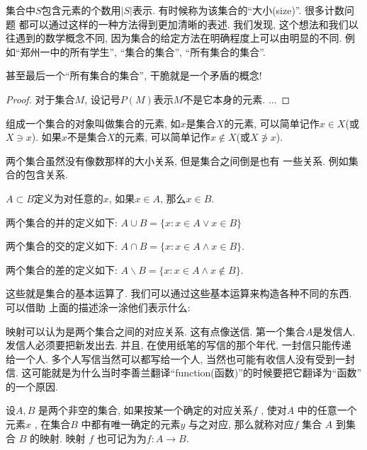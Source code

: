 集合中$S$包含元素的个数用$|S|$表示. 有时候称为该集合的``大小(size)''. 很多计数问题
都可以通过这样的一种方法得到更加清晰的表述. 
我们发现, 这个想法和我们以往遇到的数学概念不同, 因为集合的给定方法在明确程度上可以由明显的不同. 
例如``郑州一中的所有学生'', ``集合的集合'', ``所有集合的集合''.

甚至最后一个``所有集合的集合'', 干脆就是一个矛盾的概念! 

\begin{proof}
    对于集合$M$, 设记号$P(M)$表示$M$不是它本身的元素. ...
\end{proof}

组成一个集合的对象叫做集合的元素, 如$x$是集合$X$的元素, 可以简单记作$x\in X$(或$X\ni x$). 
如果$x$不是集合$X$的元素, 可以简单记作$x\not \in X$(或$X\not\ni x$). 

 两个集合虽然没有像数那样的大小关系, 但是集合之间倒是也有
一些关系. 例如集合的包含关系. 

\begin{definition}[集合的包含关系]
  $A\subset B$定义为对任意的$x$, 如果$x\in A$, 那么$x\in B$.  
\end{definition}

\begin{definition}
  两个集合的并的定义如下: $A\cup B=\{x:x\in A \lor x\in B\}$
\end{definition}

\begin{definition}
两个集合的交的定义如下: $A\cap B=\{x:x\in A \land x\in B\}$.
\end{definition}

\begin{definition}
  两个集合的差的定义如下: $A\backslash B=\{x:x\in A \land x\notin B\}$.
  \end{definition}

这些就是集合的基本运算了. 我们可以通过这些基本运算来构造各种不同的东西. 可以借助
上面的描述涂一涂他们表示什么: 




映射可以认为是两个集合之间的对应关系. 这有点像送信. 第一个集合$A$是发信人. 
发信人必须要把新发出去. 并且, 在使用纸笔的写信的那个年代, 一封信只能传递
给一个人. 多个人写信当然可以都写给一个人, 当然也可能有收信人没有受到一封信.
这可能就是为什么当时李善兰翻译``function(函数)''的时候要把它翻译为``函数''
的一个原因. 

\begin{definition}[映射]
  设$A,B$ 是两个非空的集合, 如果按某一个确定的对应关系$f$ , 
  使对$A$ 中的任意一个元素$x$ , 在集合$B$ 中都有唯一确定的元素$y$ 与之对应, 
  那么就称对应$f$ 集合 $A$ 到集合 $B$ 的映射. 映射 $f$ 也可记为为$f:A\to B$.
\end{definition}


